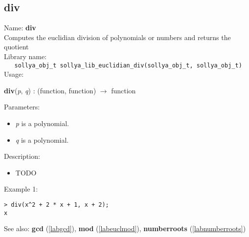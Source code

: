 \subsection{div}
\label{labeucldiv}
\noindent Name: \textbf{div}\\
\phantom{aaa}Computes the euclidian division of polynomials or numbers and returns the quotient\\[0.2cm]
\noindent Library name:\\
\verb|   sollya_obj_t sollya_lib_euclidian_div(sollya_obj_t, sollya_obj_t)|\\[0.2cm]
\noindent Usage: 
\begin{center}
\textbf{div}(\emph{p}, \emph{q}) : (\textsf{function}, \textsf{function}) $\rightarrow$ \textsf{function}\\
\end{center}
Parameters: 
\begin{itemize}
\item \emph{p} is a polynomial.
\item \emph{q} is a polynomial.
\end{itemize}
\noindent Description: \begin{itemize}

\item TODO
\end{itemize}
\noindent Example 1: 
\begin{center}\begin{minipage}{15cm}\begin{Verbatim}[frame=single]
> div(x^2 + 2 * x + 1, x + 2);
x
\end{Verbatim}
\end{minipage}\end{center}
See also: \textbf{gcd} (\ref{labgcd}), \textbf{mod} (\ref{labeuclmod}), \textbf{numberroots} (\ref{labnumberroots})
